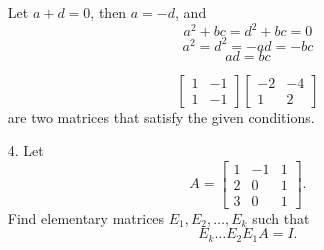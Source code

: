 \documentclass{article}
\begin{document}
\begin{enumerate}[listparindent=\parindent]
Let \(a + d = 0\), then \(a = -d\), and
\[a^2 + bc = d^2 + bc = 0\]
\[a^2 = d^2 = -ad = -bc\]
\[ad = bc\]

\[
    \begin{bmatrix}
        1 & -1 \\
        1 & -1
    \end{bmatrix}
    \begin{bmatrix}
        -2 & -4 \\
        1 & 2
    \end{bmatrix}
\]
are two matrices that satisfy the given conditions.

\item[4.] Let
    \[
        A = \begin{bmatrix}
            1 & -1 & 1 \\
            2 & 0 & 1 \\
            3 & 0 & 1
        \end{bmatrix}.
    \] Find elementary matrices \(E_1, E_2, \dots, E_k\) such that
    \[E_k \dots E_2E_1A = I.\]


\end{enumerate}
\end{document}
